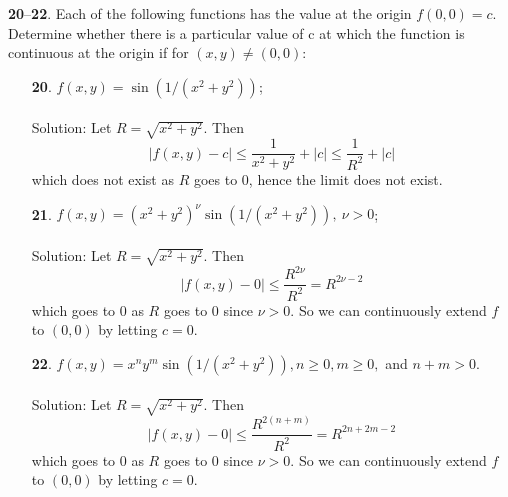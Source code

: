 \documentclass[12pt]{amsbook}
\begin{document}
\noindent
{\small {\bf 20}--{\bf 22}}. Each of the following functions has the value at the origin $f(0, 0) =
c$. Determine whether there is a particular value of c at which the function is continuous at the origin if for $(x, y) \neq (0, 0)$:
\begin{enumerate}
  \item[{\small\bf 20}.] $f(x,y)=\sin(1/(x^2+y^2))$;
  \\
  \\
  {\sc Solution}: Let $R=\sqrt{x^2+y^2}$. Then
  $$|f(x,y)-c| \leq \frac{1}{x^2+y^2}+|c| \leq \frac{1}{R^2}+|c|$$
  which does not exist as $R$ goes to $0$, hence the limit does not exist.
  \\
  \item[{\small\bf 21}.] $f(x,y)=(x^2+y^2)^{\nu}\sin(1/(x^2+y^2)), \ \nu>0$;
  \\
  \\
  {\sc Solution}: Let $R=\sqrt{x^2+y^2}$. Then
  $$|f(x,y)-0| \leq \frac{R^{2\nu}}{R^2} = R^{2\nu-2}$$
  which goes to $0$ as $R$ goes to $0$ since $\nu >0$. So we can continuously extend $f$ to $(0,0)$ by letting $c=0$.
  \\
  \item[{\small\bf 22}.] $f(x,y)=x^ny^m\sin(1/(x^2+y^2)), n\geq 0, m \geq 0,$ and $n+m>0$.
  \\
  \\
  {\sc Solution}: Let $R=\sqrt{x^2+y^2}$. Then
  $$|f(x,y)-0| \leq \frac{R^{2(n+m)}}{R^2}=R^{2n+2m-2}$$
  which goes to $0$ as $R$ goes to $0$ since $\nu >0$. So we can continuously extend $f$ to $(0,0)$ by letting $c=0$.
  \\
\end{enumerate}
\end{document}
